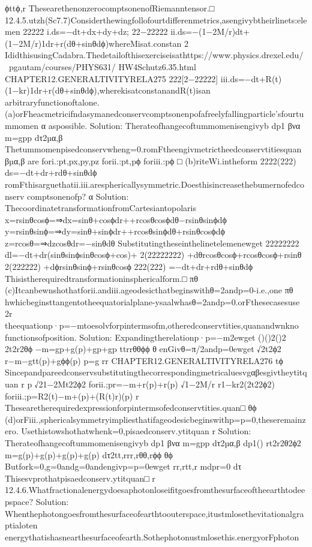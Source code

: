 {{{{{{{{{{{{{{{{ϕttϕ,r
ThesearethenonzerocomptsonenofRiemanntensor.□
12.4.5.utzh(Sc7.7)Considerthewingfollofourtdifferenmetrics,asengivybtheirlinets:elemen
22222
i.ds=−dt+dx+dy+dz;
22−22222
ii.ds=−(1−2M/r)dt+(1−2M/r)1dr+r(dθ+sinθdϕ)whereMisat.constan
2
IdidthisusingCadabra.Thedetailofthisexerciseisathttps://www.physics.drexel.edu/~pgautam/courses/PHYS631/
HW4Schutz6.35.html
CHAPTER12.GENERALTIVITYRELA275
222[2−22222]
iii.ds=−dt+R(t)(1−kr)1dr+r(dθ+sinθdϕ),wherekisatconstanandR(t)isan
arbitraryfunctionoftalone.
(a)orFheacmetricifndasymanedconservcomptsonenpofafreelyfallingparticle’sfourtummomen
α
aspossible.
Solution:
Therateofhangecoftummomenisengivyb
dp1
βνα
m=gpp
dτ2µα,β
Thetummomenpisedconservwheng=0.romFtheengivmetrictheedconservtitiesquan
βµα,β
are
fori.:pt,px,py,pz
forii.:pt,pϕ
foriii.:pϕ
□
(b)riteWi.intheform
2222(222)
ds=−dt+dr+rdθ+sinθdϕ
romFthisarguethatii.iii.aresphericallysymmetric.Doesthisincreasethebumernofedconserv
comptsonenofp?
α
Solution:
ThecoordinatetransformationfromCartesiantopolaris
x=rsinθcosϕ=⇒dx=sinθ+cosϕdr++rcosθcosϕdθ−rsinθsinϕdϕ
y=rsinθsinϕ=⇒dy=sinθ+sinϕdr++rcosθsinϕdθ+rsinθcosϕdϕ
z=rcosθ=⇒dzcosθdr=−sinθdθ
Substitutingtheseinthelinetelemenewget
22222222
dl=−dt+dr(sinθsinϕsinθcosϕ+cos)+
2(22222222)
+dθrcosθcosϕ+rcosθcosϕ+rsinθ
2(222222)
+dϕrsinθsinϕ+rsinθcosϕ
222(222)
=−dt+dr+rdθ+sinθdϕ
Thisistherequiredtransformationinsphericalform.□
πθ
(c)Itcanbewnshothatforii.andiii.ageodesicthatbeginswithθ=2andp=0-i.e.,one
πθ
hwhicbeginsttangentotheequatorialplane-ysaalwhasθ=2andp=0.orFthesecasesuse
2r
theequationp·p=−mtoesolvforpintermsofm,otheredconservtities,quanandwnkno
functionsofposition.
Solution:
Expandingtherelationp·p=−m2ewget
()()2()2
2t2r2θϕ
−m=gp+g(p)+gp+gp
ttrrθθϕϕ
θ
enGivθ=π/2andp=0ewget
√2t2ϕ2
r−m−gtt(p)+gϕϕ(p)
p=g
rr
CHAPTER12.GENERALTIVITYRELA276
tϕ
Sincepandpareedconservsubstitutingthecorrespondingmetricaluesvgαβesgivtheytitquan
r
p
√21−2Mt22ϕ2
forii.;pr=−m+r(p)+r(p)
√1−2M/r
r1−kr2(2t22ϕ2)
foriii.;p=R2(t)−m+(p)+(R(t)r)(p)
r
Thesearetherequiredexpressionforpintermsofedconservtities.quan□
θϕ
(d)orFiii.,sphericalsymmetryimpliesthatifageodesicbeginswithp=p=0,theseremainzero.
Usethistowshothatwhenk=0,pisaedconserv.ytitquan
r
Solution:
Therateofhangecoftummomenisengivyb
dp1
βνα
m=gpp
dτ2µα,β
dp1()
rt2r2θ2ϕ2
m=g(p)+g(p)+g(p)+g(p)
dτ2tt,rrr,rθθ,rϕϕ
θϕ
Butfork=0,g=0andg=0andengivp=p=0ewget
rr,rtt,r
mdpr=0
dτ
Thisesvprothatpisaedconserv.ytitquan□
r
12.4.6.Whatfractionalenergydoesaphotonloseifitgoesfromthesurfaceoftheearthtodeepspace?
Solution:
Whenthephotongoesfromthesurfaceofearthtoouterspace,itustmlosethevitationalgraptialoten
energythatishasnearthesurfaceofearth.Sothephotonustmlosethis.energyorFphoton
}}}}}}}}}}}}}}}}
